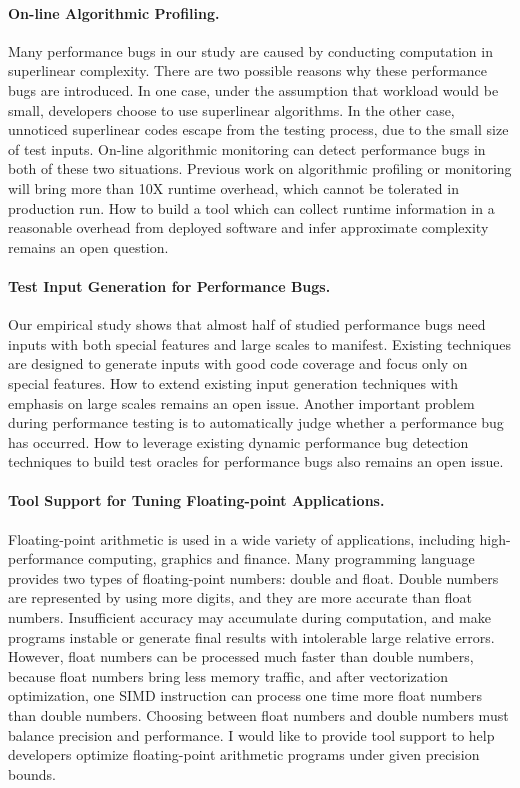 \documentclass[10pt]{article}
\begin{document}
\paragraph{On-line Algorithmic Profiling.}
Many performance bugs in our study are caused by conducting computation in superlinear complexity. 
There are two possible reasons why these performance bugs are introduced. 
In one case, under the assumption that workload would be small, developers choose to use superlinear algorithms. 
In the other case, unnoticed superlinear codes escape from the testing process, due to the small size of test inputs. 
On-line algorithmic monitoring can detect performance bugs in both of these two situations. 
Previous work on algorithmic profiling or monitoring will bring more than 10X runtime overhead, 
which cannot be tolerated in production run. 
How to build a tool which can collect runtime information in a reasonable overhead from deployed software 
and infer approximate complexity remains an open question. 

\paragraph{Test Input Generation for Performance Bugs.}
Our empirical study shows that almost half of studied performance bugs need inputs with both special features and large scales to manifest. 
Existing techniques are designed to generate inputs with good code coverage and focus only on special features.
How to extend existing input generation techniques with emphasis on large scales remains an open issue. 
Another important problem during performance testing is to automatically judge whether a performance bug has occurred. 
How to leverage existing dynamic performance bug detection techniques to build test oracles for performance bugs also remains an open issue.

\paragraph{Tool Support for Tuning Floating-point Applications.}
Floating-point arithmetic is used in a wide variety of applications, 
including high-performance computing, graphics and finance. 
Many programming language provides two types of floating-point numbers: double and float. 
Double numbers are represented by using more digits, and they are more accurate than float numbers. 
Insufficient accuracy may accumulate during computation, 
and make programs instable or generate final results with intolerable large relative errors. 
However, float numbers can be processed much faster than double numbers, 
because float numbers bring less memory traffic, 
and after vectorization optimization, one SIMD instruction can process one time more float numbers than double numbers. 
Choosing between float numbers and double numbers must balance precision and performance. 
I would like to provide tool support to help developers optimize floating-point arithmetic programs under given precision bounds. 
\end{document}
